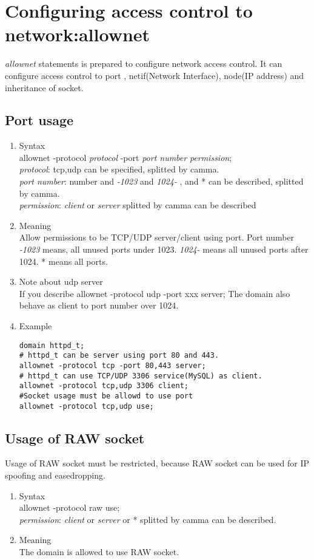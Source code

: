 \documentclass{article}
\begin{document}
\begin{enumerate}
\end{enumerate}



\section{Configuring access control to network:allownet}
{\it allownet} statements is prepared to configure network access control.
It can configure access control to  port , netif(Network
Interface), node(IP address) and inheritance of socket.

\subsection{Port usage}
\begin{enumerate}
 \item Syntax\\
 allownet -protocol {\it protocol} -port {\it port number} {\it permission};\\
 {\it protocol}: tcp,udp can be specified, splitted by camma.\\
 {\it port number}: number and {\it -1023} and {\it 1024-} , and * can
       be described, splitted by camma.\\
 {\it permission}: {\it client} or {\it server} splitted by camma can be
       described
 \item Meaning\\
       Allow permissions to be TCP/UDP server/client using port. Port number {\it
       -1023} means, all unused ports under 1023. {\it 1024-} means all
       unused ports after 1024. * means all ports. 
 \item Note about udp server\\
       If you describe allownet -protocol udp -port xxx server;
       The domain also behave as client to port number over 1024.
 \item Example
\begin{verbatim}
domain httpd_t;
# httpd_t can be server using port 80 and 443.
allownet -protocol tcp -port 80,443 server;
# httpd_t can use TCP/UDP 3306 service(MySQL) as client.
allownet -protocol tcp,udp 3306 client;
#Socket usage must be allowd to use port
allownet -protocol tcp,udp use;
\end{verbatim}
\end{enumerate}

\subsection{Usage of RAW socket}
Usage of RAW socket must be restricted, because RAW socket can be used
for IP spoofing and easedropping.
\begin{enumerate}
 \item Syntax\\
       allownet -protocol raw use;\\
        {\it permission}: {\it client} or {\it server} or * splitted by camma can be
       described.
 \item Meaning\\
       The domain is allowed to use RAW socket.
\end{enumerate}
\end{document}
